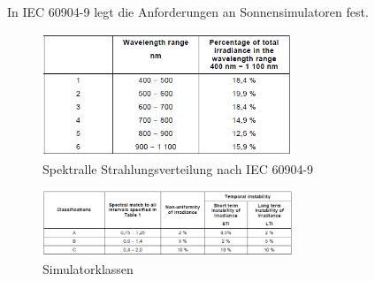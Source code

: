 \documentclass[a4paper,bibtotoc,oneside]{scrbook}
\begin{document}
In IEC 60904-9 legt die Anforderungen an Sonnensimulatoren fest.

\begin{figure}[htbp]
\centering
\includegraphics[width=75mm]{img/spectral.png}
\caption[Spektralle Strahlungsverteilung]{Spektralle Strahlungsverteilung nach IEC 60904-9}\label{rolle}
\end{figure}

\begin{figure}[htbp]
\centering
\includegraphics[width=75mm]{img/simclass.png}
\caption[Simulatorklassen]{Simulatorklassen}\label{Sim2}
\end{figure}
\end{document}
